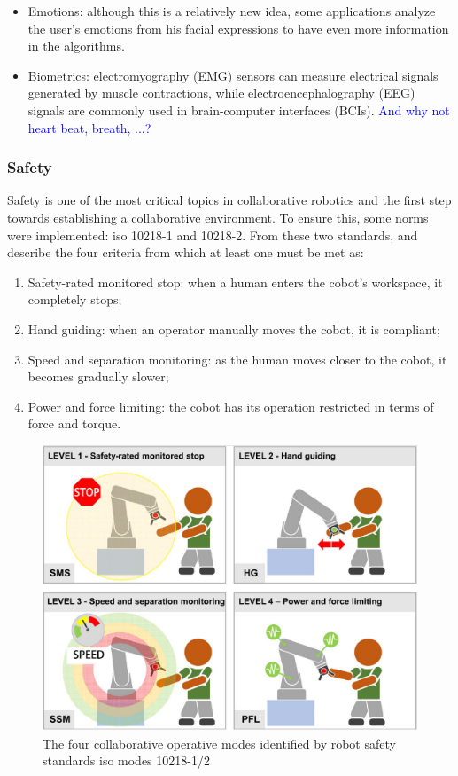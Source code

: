 \begin{itemize}
\item Emotions: although this is a relatively new idea, some applications analyze the user's emotions from his facial expressions to have even more information in the algorithms.

\item Biometrics: electromyography (EMG) sensors can measure electrical signals generated by muscle contractions, while electroencephalography (EEG) signals are commonly used in brain-computer interfaces (BCIs). \textcolor{blue}{And why not heart beat, breath, ...?}

\end{itemize}

\subsubsection{Safety}

Safety is one of the most critical topics in collaborative robotics and the first step towards establishing a collaborative environment. To ensure this, some norms were implemented: \acs{iso} 10218-1 and 10218-2. From these two standards, \textcite{Villani2018} and \textcite{Castro2021} describe the four criteria from which at least one must be met as:

\begin{enumerate}
  \item Safety-rated monitored stop: when a human enters the cobot's workspace, it completely stops;
  \item Hand guiding: when an operator manually moves the cobot, it is compliant;
  \item Speed and separation monitoring: as the human moves closer to the cobot, it becomes gradually slower;
  \item Power and force limiting: the cobot has its operation restricted in terms of force and torque.
\end{enumerate}

\begin{figure}[H]
\centerline{\includegraphics[width=4.5in]{figs/iso.png}}
\caption{The four collaborative operative modes identified by robot safety standards \acs{iso} modes 10218-1/2 \cite{Villani2018}}
\label{isonorms}
\end{figure}

